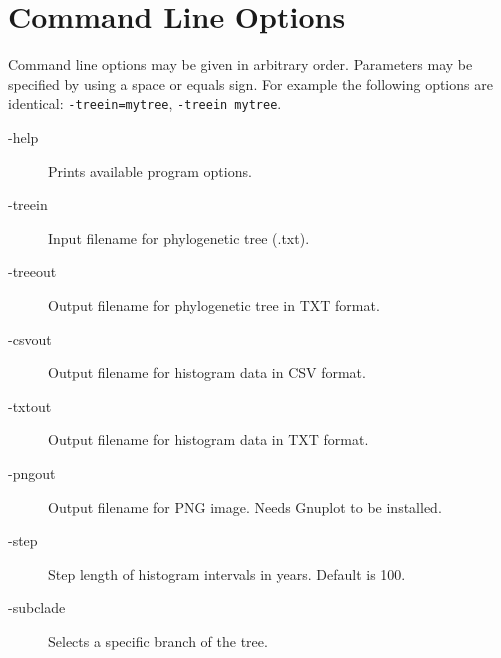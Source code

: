 \section{Command Line Options}

Command line options may be given in arbitrary order.
Parameters may be specified by using a space or equals sign.
For example the following options are identical:
\texttt{-treein=mytree}, \texttt{-treein mytree}.

\begin{description}
\item[-help] Prints available program options.

\item[-treein] Input filename for phylogenetic tree (.txt).
\item[-treeout] Output filename for phylogenetic tree in TXT format.
\item[-csvout] Output filename for histogram data in CSV format.
\item[-txtout] Output filename for histogram data in TXT format.
\item[-pngout] Output filename for PNG image.
	 Needs Gnuplot \cite{Gnuplot} to be installed.
\item[-step] Step length of histogram intervals in years.
	Default is 100.
\item[-subclade] Selects a specific branch of the tree.
\end{description}

